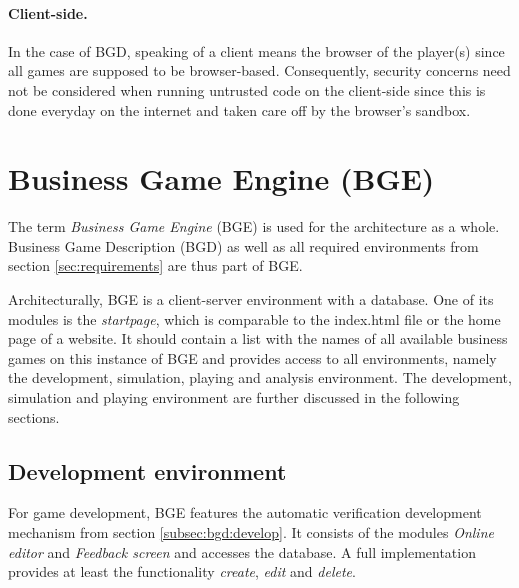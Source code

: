 \paragraph{Client-side.} In the case of BGD, speaking of a client means the browser of the player(s) since all games are supposed to be browser-based. Consequently, security concerns need not be considered when running untrusted code on the client-side since this is done everyday on the internet and taken care off by the browser's sandbox.

\section{Business Game Engine (BGE)}
\label{sec:bge}

The term \textit{Business Game Engine} (BGE) is used for the architecture as a whole. Business Game Description (BGD) as well as all required environments from section \ref{sec:requirements} are thus part of BGE. 

Architecturally, BGE is a client-server environment with a database. One of its modules is the \textit{startpage}, which is comparable to the index.html file or the home page of a website. It should contain a list with the names of all available business games on this instance of BGE and provides access to all environments, namely the development, simulation, playing and analysis environment. The development, simulation and playing environment are further discussed in the following sections.

\subsection{Development environment}
\label{subsec:bge:d&a}

For game development, BGE features the automatic verification development mechanism from section \ref{subsec:bgd:develop}. It consists of the modules \textit{Online editor} and \textit{Feedback screen} and accesses the database. A full implementation provides at least the functionality \textit{create}, \textit{edit} and \textit{delete}.

